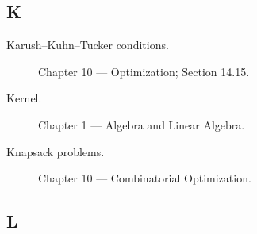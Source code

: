 \subsection*{K}

\begin{description}

\item[Karush--Kuhn--Tucker conditions.]
Chapter 10 --- Optimization;
Section 14.15.

\item[Kernel.]
Chapter 1 --- Algebra and Linear Algebra.

\item[Knapsack problems.]
Chapter 10 --- Combinatorial Optimization.

\end{description}

\subsection*{L}

